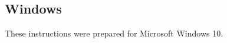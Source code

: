 \begin{comment}
\subsubsection{Release 10.0}

Install the following packages:
\begin{itemize}
 \item python
 \item scons
 \item boost-python-libs
 \item bash
 \item netcdf
 \item silo
 \item py27-scipy
 \item py27-gdal
 \item py27-matplotlib
 \item py27-pyproj
 \item py27-sympy
\end{itemize}

\noindent Next choose (or create) your options file.
For the setup as above the escript source comes with a prepared file in
\texttt{scons/templates/freebsd10.0_options.py}.
Finally to build escript issue the following in the escript source directory
(replace the options file as required):
\begin{shellCode}
scons -j1 options_file=scons/templates/freebsd10.0_options.py
\end{shellCode}

\emph{Note:} Some packages installed above are built with gcc 4.7. Somewhere
in the toolchain a system-installed gcc library is pulled in which is
incompatible with the one from version 4.7 and would prevent escript from
executing successfully. As explained in the FreeBSD
documentation\footnote{see \url{http://www.freebsd.org/doc/en/articles/custom-gcc/article.html}}
this can be fixed by adding a line to \texttt{/etc/libmap.conf}:
\begin{shellCode}
libgcc_s.so.1 gcc47/libgcc_s.so.1
\end{shellCode}

\end{comment}
\subsection{Windows}\label{sec:windowssrc}

\noindent These instructions were prepared for Microsoft Windows 10.


